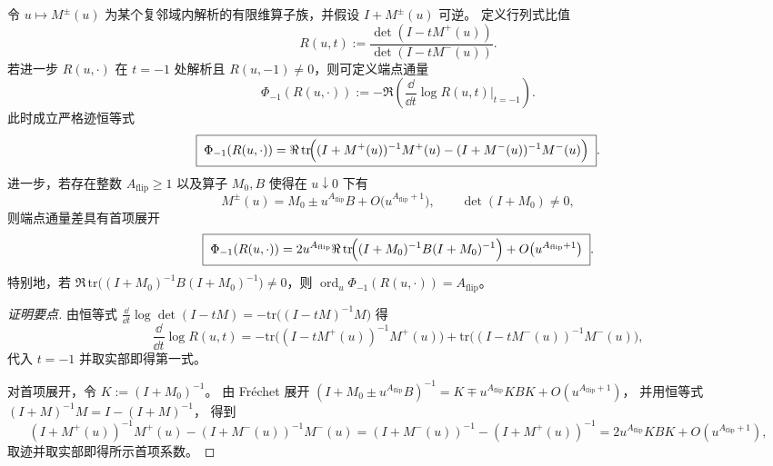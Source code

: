 \begin{conclusion}[端点 Poisson 通量的可审计迹公式：\texorpdfstring{$t=-1$}{t=-1} 处 resolvent 的通道差]\label{con:xi-endpoint-flux-resolvent-trace-channel-difference}
令 \(u\mapsto M^{\pm}(u)\) 为某个复邻域内解析的有限维算子族，并假设 \(I+M^{\pm}(u)\) 可逆。
定义行列式比值
\[
R(u,t):=\frac{\det(I-tM^{+}(u))}{\det(I-tM^{-}(u))}.
\]
若进一步 \(R(u,\cdot)\) 在 \(t=-1\) 处解析且 \(R(u,-1)\neq 0\)，则可定义端点通量
\[
\Phi_{-1}(R(u,\cdot))
:=
-\Re\left(\frac{\dd}{\dd t}\log R(u,t)\Big|_{t=-1}\right).
\]
此时成立严格迹恒等式
\[
\boxed{\;
\Phi_{-1}(R(u,\cdot))
=
\Re\,\mathrm{tr}\!\Bigl((I+M^{+}(u))^{-1}M^{+}(u)-(I+M^{-}(u))^{-1}M^{-}(u)\Bigr)\; }.
\]
进一步，若存在整数 \(A_{\mathrm{flip}}\ge 1\) 以及算子 \(M_0,B\) 使得在 \(u\downarrow 0\) 下有
\[
M^{\pm}(u)=M_0\pm u^{A_{\mathrm{flip}}}B+O\bigl(u^{A_{\mathrm{flip}}+1}\bigr),
\qquad
\det(I+M_0)\neq 0,
\]
则端点通量差具有首项展开
\[
\boxed{\;
\Phi_{-1}(R(u,\cdot))
=
2u^{A_{\mathrm{flip}}}\Re\,\mathrm{tr}\!\Bigl((I+M_0)^{-1}B(I+M_0)^{-1}\Bigr)
+O\bigl(u^{A_{\mathrm{flip}}+1}\bigr)\; }.
\]
特别地，若 \(\Re\,\mathrm{tr}\!\bigl((I+M_0)^{-1}B(I+M_0)^{-1}\bigr)\neq 0\)，则 \(\operatorname{ord}_u \Phi_{-1}(R(u,\cdot))=A_{\mathrm{flip}}\)。
\end{conclusion}
\begin{proof}[证明要点]
由恒等式
\(
\frac{\dd}{\dd t}\log\det(I-tM)=-\mathrm{tr}\!\bigl((I-tM)^{-1}M\bigr)
\)
得
\[
\frac{\dd}{\dd t}\log R(u,t)
=
-\mathrm{tr}\!\bigl((I-tM^{+}(u))^{-1}M^{+}(u)\bigr)
+\mathrm{tr}\!\bigl((I-tM^{-}(u))^{-1}M^{-}(u)\bigr),
\]
代入 \(t=-1\) 并取实部即得第一式。
\par
对首项展开，令 \(K:=(I+M_0)^{-1}\)。
由 Fr\'echet 展开
\(
(I+M_0\pm u^{A_{\mathrm{flip}}}B)^{-1}=K\mp u^{A_{\mathrm{flip}}}KBK+O(u^{A_{\mathrm{flip}}+1})
\)，
并用恒等式 \((I+M)^{-1}M=I-(I+M)^{-1}\)，
得到
\[
(I+M^{+}(u))^{-1}M^{+}(u)-(I+M^{-}(u))^{-1}M^{-}(u)
=(I+M^{-}(u))^{-1}-(I+M^{+}(u))^{-1}
=2u^{A_{\mathrm{flip}}}KBK+O(u^{A_{\mathrm{flip}}+1}),
\]
取迹并取实部即得所示首项系数。
\end{proof}

